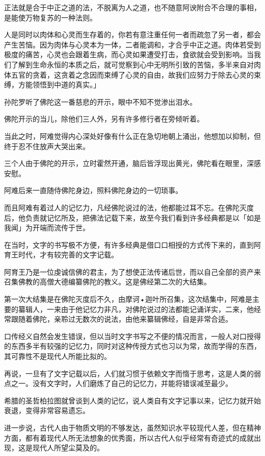 \documentclass[twoside,openany]{book}
\begin{document}
正法就是合于中正之道的法，不脱离为人之道，也不随意阿谀附合不合理的事相，是能使万物复苏的一种法则。

人是同时以肉体和心灵而生存着的，你若有意注重任何一者而疏忽了另一者，都会产生苦恼。因为肉体与心灵本为一体，二者能调和，才合乎中正之道。肉体若受到极度的痛苦，心灵也会跟着生病，而心灵如果遭受打击，食欲就会受到影响。当我们了解到生命永恒的本质之后，就可觉察到心中无明所引致的苦恼，多半来自对肉体五官的贪着，这贪着之念因而束缚了心灵的自由，故我们应努力于除去心灵的束缚，方能领悟到中道的真实。」

孙陀罗听了佛陀这一番慈悲的开示，眼中不知不觉渗出泪水。

佛陀开示的当儿，除他们三人外，另有许多修行者在旁倾听着。

当此之时，阿难觉得内心深处好像有什么正在急切地朝上涌出，他想加以抑制，但终于忍不住放声大哭出来。

三个人由于佛陀的开示，立时霍然开通，脑后皆浮现出黄光，佛陀看在眼里，深感安慰。

阿难后来一直随侍佛陀身边，照料佛陀身边的一切琐事。

而且阿难有着过人的记忆力，凡经佛陀说过的法，他都能过耳不忘。在佛陀灭度后，他负责就记忆所及，把佛法记载下来，故至今我们看到许多经典都是以「如是我闻」为开端而流传于世。

在当时，文字的书写极不方便，有许多经典是借口口相授的方式传下来的，直到阿育王时代，才有较完善的文字记载。

阿育王乃是一位虔诚信佛的君主，为了想使正法传诸后世，而以自己全部的资产来召集佛教的高僧大德编纂佛陀的教义。这是佛经第二次的大结集。

第一次大结集是在佛陀灭度后不久，由摩诃•迦叶所召集，这次结集中，阿难是主要的纂辑人，一来由于他记忆力非凡，对佛陀说过的法都能记诵详实，二来，他经常跟随着佛陀，亲聆过无数次的说法，由他来纂辑佛经，自是非常合适。

口传经义自然会发生错误，但以当时文字书写之不便的情况而言，一般人对口授得的东西多半有较强的记忆力，同时对这种传授方式也习以为常，故而学得的东西，其可靠性不是现代人所能比拟的。

再说，一旦有了文字记载以后，人们就习惯于依赖文字而惰于思考，这是人类的弱点之一。没有文字时，人们磨炼了自己的记忆力，并能将错误减至最少。

希腊的圣哲柏拉图就曾谈到人类的记忆，说人类自有文字记事以来，记忆力就开始衰退，变得非常容易遗忘。

进一步说，古代人由于物质文明的不够发达，虽然知识水平较现代人差，但在精神方面，都有着现代人所无法想象的优秀面，所以古代人似乎经常有奇迹式的成就出现，这是现代人所望尘莫及的。
\end{document}
